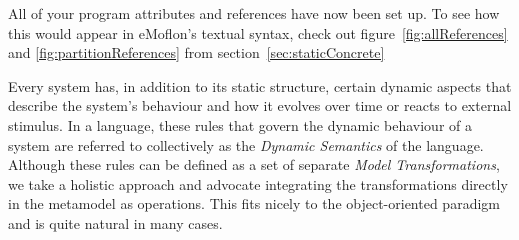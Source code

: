 All of your program attributes and references have now been set up. To see how this would appear in eMoflon's textual syntax, check out figure~\ref{fig:allReferences} and \ref{fig:partitionReferences} from section~\ref{sec:staticConcrete} 

Every system has, in addition to its static structure, certain dynamic aspects that describe the system's behaviour and how it evolves over time or reacts to external stimulus.
In a language, these rules that govern the dynamic behaviour of a system are referred to collectively as the \emph{Dynamic Semantics} of the language.
Although these rules can be defined as a set of separate \emph{Model Transformations}, we take a holistic approach and advocate integrating the transformations directly in the metamodel as operations.
This fits nicely to the object-oriented paradigm and is quite natural in many cases.

